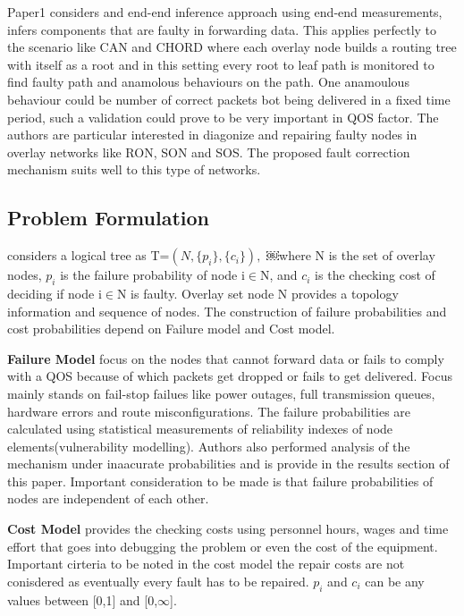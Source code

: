 \documentclass[10pt]{sigplan-proc-varsize}
\begin{document}
Paper1 considers and end-end inference approach using end-end measurements, infers components that are faulty in forwarding data. This applies perfectly to the scenario like CAN\cite{Ratnasamy:01} and CHORD\cite{Stoica:01} where each overlay node builds a routing tree with itself as a root and in this setting every root to leaf path is monitored to find faulty path and anamolous behaviours on the path. One anamoulous behaviour could be number of correct packets bot being delivered in a fixed time period, such a validation could prove to be very important in QOS factor.  The authors are particular interested in diagonize and repairing faulty nodes in overlay networks like RON\cite{Andersen:01}, SON\cite{Duan:03} and SOS\cite{Misra:04}. The proposed fault correction mechanism suits well to this type of  networks. 

\subsection{Problem Formulation}
\cite{pclee:07} considers a logical tree as T=$(N,\{{p_i}\},\{{c_i}\}),$ ￼where N is the set of overlay nodes, $p_i$ is the failure probability of node i$\in$N, and $c_i$ is the checking cost of deciding if node i$\in$N is faulty. Overlay set node N provides a topology information and sequence of nodes. The construction of failure probabilities and cost probabilities depend on Failure model and Cost model.

{\bf Failure Model} focus on the nodes that cannot forward data or fails to comply with a QOS because of which packets get dropped or fails to get delivered. Focus mainly stands on fail-stop failues like power outages, full transmission queues, hardware errors and route misconfigurations. The failure probabilities are calculated using statistical measurements of reliability indexes of node elements(vulnerability modelling).  Authors also performed analysis of the  mechanism under inaacurate probabilities and is provide in the results section of this paper. Important consideration to be made is that failure probabilities of nodes are independent of each other. 

{\bf Cost Model} provides the checking costs using personnel hours, wages and time effort that goes into debugging the problem or even the cost of the equipment. Important cirteria to be noted in the cost model the repair costs are not conisdered as eventually every fault has to be repaired. $p_i$ and $c_i$ can be any values between [0,1] and [0,$\infty$].
\end{document}
